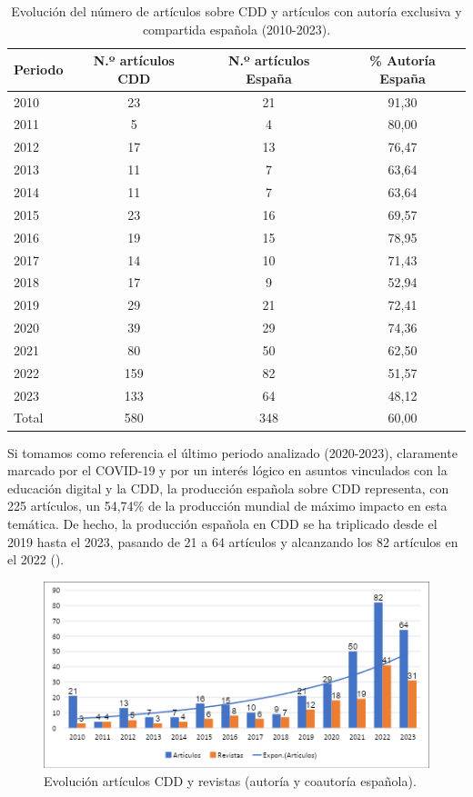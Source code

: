 \documentclass[spanish]{textolivre}
\begin{document}
\begin{table}[h!]
\centering
\begin{threeparttable}
\caption{Evolución del número de artículos sobre CDD y artículos con autoría exclusiva y compartida española (2010-2023).} \label{tab-3}
\begin{tabular}{lccc}
\toprule
Periodo & N.º artículos CDD & N.º artículos España & \% Autoría España \\
\midrule
2010 & 23 & 21 & 91,30 \\
2011 & 5 & 4 & 80,00 \\
2012 & 17 & 13 & 76,47 \\
2013 & 11 & 7 & 63,64 \\
2014 & 11 & 7 & 63,64 \\
2015 & 23 & 16 & 69,57 \\
2016 & 19 & 15 & 78,95 \\
2017 & 14 & 10 & 71,43 \\
2018 & 17 & 9 & 52,94 \\
2019 & 29 & 21 & 72,41 \\
2020 & 39 & 29 & 74,36 \\
2021 & 80 & 50 & 62,50 \\
2022 & 159 & 82 & 51,57 \\
2023 & 133 & 64 & 48,12 \\
\addlinespace
Total & 580 & 348 & 60,00 \\
\bottomrule
\end{tabular}
\end{threeparttable}
\end{table}

Si tomamos como referencia el último periodo analizado (2020-2023), claramente marcado por el COVID-19 y por un interés lógico en asuntos vinculados con la educación digital y la CDD, la producción española sobre CDD representa, con 225 artículos, un 54,74\% de la producción mundial de máximo impacto en esta temática. De hecho, la producción española en CDD se ha triplicado desde el 2019 hasta el 2023, pasando de 21 a 64 artículos y alcanzando los 82 artículos en el 2022 ().

\begin{figure}[h!]
    \centering
    \begin{minipage}{.8\textwidth} 
    \includegraphics[width=\linewidth]{images/image3.png}
    \caption{Evolución artículos CDD y revistas (autoría y coautoría española).}
    \label{fig-3}
    \end{minipage}
\end{figure}
\end{document}
